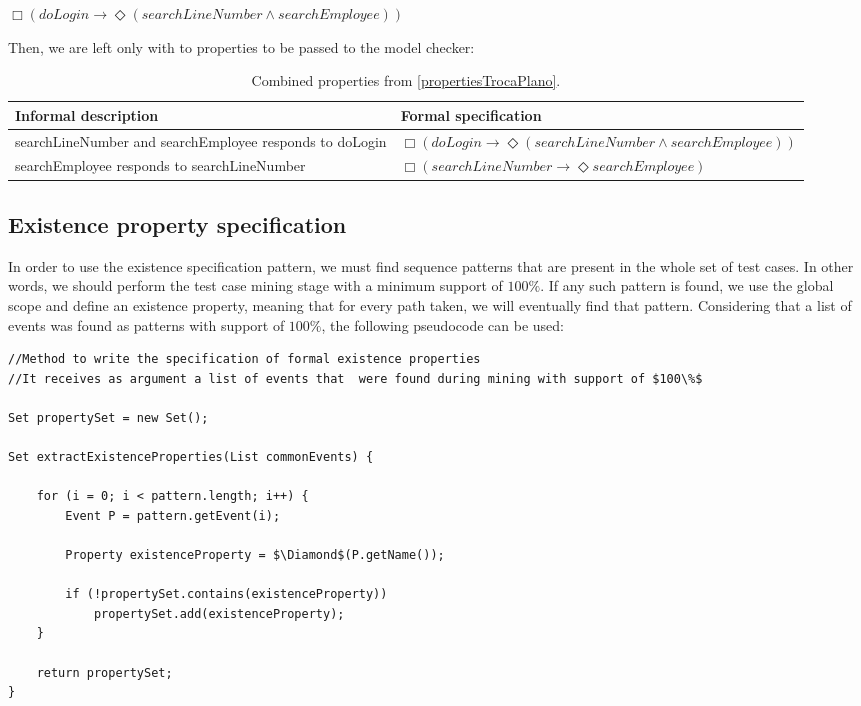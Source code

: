 \begin{center}
$\Box (doLogin \rightarrow \Diamond (searchLineNumber \wedge searchEmployee))$
\end{center}

Then, we are left only with to properties to be passed to the model checker:

\begin{table}[h]
\begin{center}
\begin{tabular}{|p{5cm}| l|}

\hline

Informal description & Formal specification \\ \hline

searchLineNumber and searchEmployee responds to doLogin & $\Box (doLogin \rightarrow \Diamond (searchLineNumber \wedge searchEmployee))$\\ \hline

searchEmployee responds to searchLineNumber & $\Box (searchLineNumber \rightarrow \Diamond searchEmployee)$ \\

\hline
\end{tabular}
\end{center}
\caption{Combined properties from \ref{propertiesTrocaPlano}.}
\label{propertiesTrocaPlanoConcise}
\end{table}

\subsection{Existence property specification}

In order to use the existence specification pattern, we must find sequence patterns that are present in the whole set of test cases. In other words, we should perform the test case mining stage with a minimum support of $100\%$. If any such pattern is found, we use the global scope and define an existence property, meaning that for every path taken, we will eventually find that pattern. Considering that a list of events was found as patterns with support of $100\%$, the following pseudocode can be used:

\begin{lstlisting}[mathescape,caption={Pseudocode to extract existence properties from the mining results}]
//Method to write the specification of formal existence properties
//It receives as argument a list of events that  were found during mining with support of $100\%$

Set propertySet = new Set();

Set extractExistenceProperties(List commonEvents) {

	for (i = 0; i < pattern.length; i++) {
		Event P = pattern.getEvent(i);

		Property existenceProperty = $\Diamond$(P.getName());

		if (!propertySet.contains(existenceProperty))
			propertySet.add(existenceProperty);
	}

	return propertySet;
}
\end{lstlisting}

